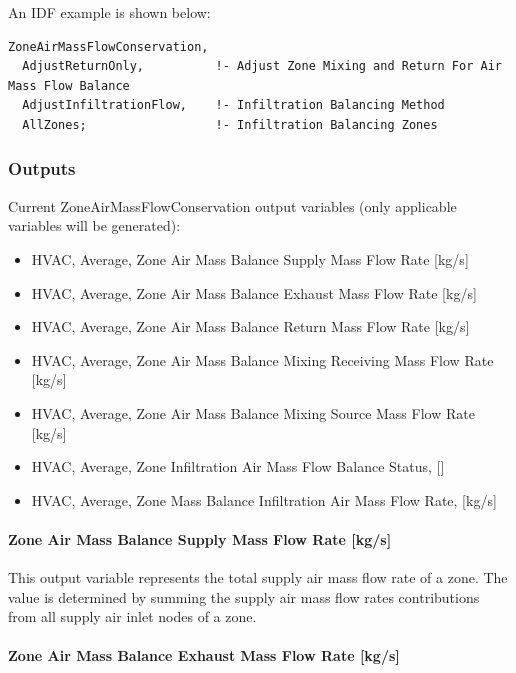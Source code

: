 An IDF example is shown below:

\begin{lstlisting}
ZoneAirMassFlowConservation,
  AdjustReturnOnly,          !- Adjust Zone Mixing and Return For Air Mass Flow Balance
  AdjustInfiltrationFlow,    !- Infiltration Balancing Method
  AllZones;                  !- Infiltration Balancing Zones
\end{lstlisting}

\subsubsection{Outputs}\label{outputs-7-000}

Current ZoneAirMassFlowConservation output variables (only applicable variables will be generated):

\begin{itemize}
\item
  HVAC, Average, Zone Air Mass Balance Supply Mass Flow Rate {[}kg/s{]}
\item
  HVAC, Average, Zone Air Mass Balance Exhaust Mass Flow Rate {[}kg/s{]}
\item
  HVAC, Average, Zone Air Mass Balance Return Mass Flow Rate {[}kg/s{]}
\item
  HVAC, Average, Zone Air Mass Balance Mixing Receiving Mass Flow Rate {[}kg/s{]}
\item
  HVAC, Average, Zone Air Mass Balance Mixing Source Mass Flow Rate {[}kg/s{]}
\item
  HVAC, Average, Zone Infiltration Air Mass Flow Balance Status, {[]}
\item
  HVAC, Average, Zone Mass Balance Infiltration Air Mass Flow Rate, {[}kg/s{]}
\end{itemize}

\paragraph{Zone Air Mass Balance Supply Mass Flow Rate {[}kg/s{]}}\label{zone-air-mass-balance-supply-mass-flow-rate-kgs}

This output variable represents the total supply air mass flow rate of a zone. The value is determined by summing the supply air mass flow rates contributions from all supply air inlet nodes of a zone.

\paragraph{Zone Air Mass Balance Exhaust Mass Flow Rate {[}kg/s{]}}\label{zone-air-mass-balance-exhaust-mass-flow-rate-kgs}

